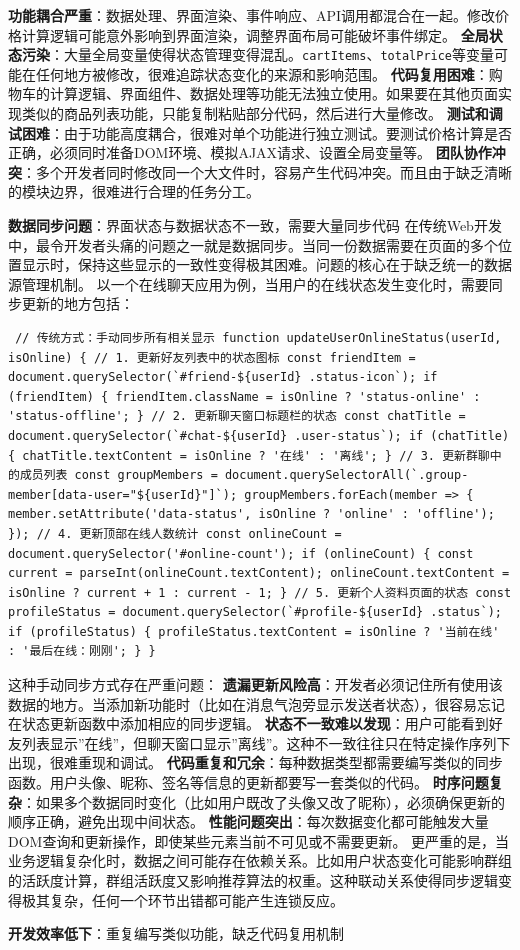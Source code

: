 \textbf{功能耦合严重}：数据处理、界面渲染、事件响应、API调用都混合在一起。修改价格计算逻辑可能意外影响到界面渲染，调整界面布局可能破坏事件绑定。 \textbf{全局状态污染}：大量全局变量使得状态管理变得混乱。\texttt{cartItems}、\texttt{totalPrice}等变量可能在任何地方被修改，很难追踪状态变化的来源和影响范围。 \textbf{代码复用困难}：购物车的计算逻辑、界面组件、数据处理等功能无法独立使用。如果要在其他页面实现类似的商品列表功能，只能复制粘贴部分代码，然后进行大量修改。 \textbf{测试和调试困难}：由于功能高度耦合，很难对单个功能进行独立测试。要测试价格计算是否正确，必须同时准备DOM环境、模拟AJAX请求、设置全局变量等。 \textbf{团队协作冲突}：多个开发者同时修改同一个大文件时，容易产生代码冲突。而且由于缺乏清晰的模块边界，很难进行合理的任务分工。 \item \textbf{数据同步问题}：界面状态与数据状态不一致，需要大量同步代码 在传统Web开发中，最令开发者头痛的问题之一就是数据同步。当同一份数据需要在页面的多个位置显示时，保持这些显示的一致性变得极其困难。问题的核心在于缺乏统一的数据源管理机制。 以一个在线聊天应用为例，当用户的在线状态发生变化时，需要同步更新的地方包括： \begin{verbatim} // 传统方式：手动同步所有相关显示 function updateUserOnlineStatus(userId, isOnline) { // 1. 更新好友列表中的状态图标 const friendItem = document.querySelector(`#friend-${userId} .status-icon`); if (friendItem) { friendItem.className = isOnline ? 'status-online' : 'status-offline'; } // 2. 更新聊天窗口标题栏的状态 const chatTitle = document.querySelector(`#chat-${userId} .user-status`); if (chatTitle) { chatTitle.textContent = isOnline ? '在线' : '离线'; } // 3. 更新群聊中的成员列表 const groupMembers = document.querySelectorAll(`.group-member[data-user="${userId}"]`); groupMembers.forEach(member => { member.setAttribute('data-status', isOnline ? 'online' : 'offline'); }); // 4. 更新顶部在线人数统计 const onlineCount = document.querySelector('#online-count'); if (onlineCount) { const current = parseInt(onlineCount.textContent); onlineCount.textContent = isOnline ? current + 1 : current - 1; } // 5. 更新个人资料页面的状态 const profileStatus = document.querySelector(`#profile-${userId} .status`); if (profileStatus) { profileStatus.textContent = isOnline ? '当前在线' : '最后在线：刚刚'; } } \end{verbatim} 这种手动同步方式存在严重问题： \textbf{遗漏更新风险高}：开发者必须记住所有使用该数据的地方。当添加新功能时（比如在消息气泡旁显示发送者状态），很容易忘记在状态更新函数中添加相应的同步逻辑。 \textbf{状态不一致难以发现}：用户可能看到好友列表显示''在线''，但聊天窗口显示''离线''。这种不一致往往只在特定操作序列下出现，很难重现和调试。 \textbf{代码重复和冗余}：每种数据类型都需要编写类似的同步函数。用户头像、昵称、签名等信息的更新都要写一套类似的代码。 \textbf{时序问题复杂}：如果多个数据同时变化（比如用户既改了头像又改了昵称），必须确保更新的顺序正确，避免出现中间状态。 \textbf{性能问题突出}：每次数据变化都可能触发大量DOM查询和更新操作，即使某些元素当前不可见或不需要更新。 更严重的是，当业务逻辑复杂化时，数据之间可能存在依赖关系。比如用户状态变化可能影响群组的活跃度计算，群组活跃度又影响推荐算法的权重。这种联动关系使得同步逻辑变得极其复杂，任何一个环节出错都可能产生连锁反应。 \item \textbf{开发效率低下}：重复编写类似功能，缺乏代码复用机制 